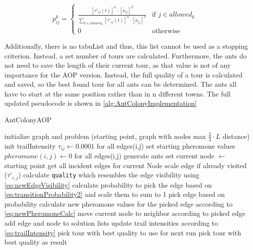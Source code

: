 \begin{equation}\label{eq:transitionProbability2}
	p_{ij}^k = \begin{cases}
		\frac{[\tau'_{ij}(t)]^{\alpha} \cdot [\nu_{ij}]^{\beta}}{\sum_{k \in allowed_k} [\tau'_{ij}(t)]^{\alpha} \cdot [\nu_{ij}]^{\beta}} &\text{if $j \in allowed_k$ }\\
		0 &\text{otherwise}
	\end{cases}
\end{equation}


Additionally, there is no tabuList and thus, this list cannot be used as a stopping criterion. 
Instead, a set number of tours are calculated.
Furthermore, the ants do not need to save the length of their current tour, as that value is not of any importance for the AOP version. 
Instead, the full quality of a tour is calculated and saved, so the best found tour for all ants can be determined.
The ants all have to start at the same position rather than in n different towns. 
The full updated pseudocode is shown in \ref{alg:AntColonyImplementation}


\begin{breakablealgorithm}
	\caption{AntColonyAOP}
	\label{alg:AntColonyImplementation}
	\begin{algorithmic}[1]
		\STATE initialize graph and problem (starting point, graph with nodes max $\frac{2}{3} \cdot L$ distance)
		\STATE init trailIntensity $\tau_{ij} \gets 0.0001$ for all edges(i,j)
		\STATE set starting pheromone values $pheromone(i,j) \gets 0$ for all edges(i,j)
		\STATE generate ants
		\STATE set current node $\gets$ starting point
		\STATE get all incident edges for current Node
		\STATE scale edge if already visited ($\tau'_{i,j}$)
		\STATE calculate \texttt{quality} which resembles the edge visibility using \ref{eq:newEdgeVisibility}
		\ENDFOR
		\STATE calculate probability to pick the edge based on \ref{eq:transitionProbability2} and scale them to sum to 1
		\STATE pick edge based on probability
		\STATE calculate new pheromone values for the picked edge according to \ref{eq:newPheromoneCalc}
		\STATE move current node to neighbor according to picked edge 
		\STATE add edge and node to solution lists
		\ENDWHILE
		\ENDFOR
		\STATE update trail intensities according to \ref{eq:trailIntensity}
		\STATE pick tour with best quality to use for next run
		\ENDFOR
		\STATE pick tour with best quality as result
	\end{algorithmic}	
\end{breakablealgorithm}

